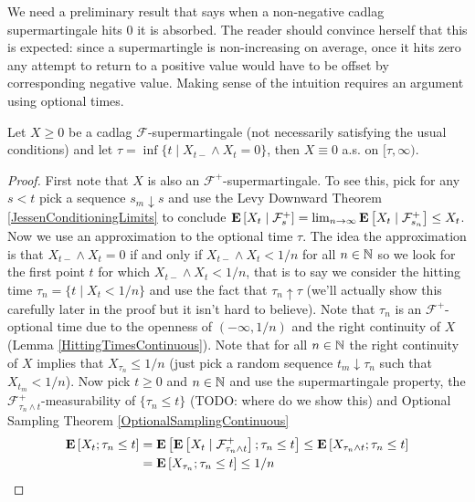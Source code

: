 We need a preliminary result that says when a non-negative cadlag supermartingale hits $0$ it is absorbed.  The reader should convince herself that this is expected: since a supermartingle is non-increasing on average, once it hits zero any attempt to return to a positive value would have to be offset by corresponding negative value.  Making sense of the intuition requires an argument using optional times.  
\begin{lem}\label{PositiveSupermartingaleAbsorption}Let $X \geq 0$ be a cadlag $\mathcal{F}$-supermartingale (not necessarily satisfying the usual conditions) and let $\tau = \inf \lbrace t \mid X_{t-} \wedge X_t =0 \rbrace$, then $X \equiv 0$ a.s. on $[\tau, \infty)$.
\end{lem}
\begin{proof}
First note that $X$ is also an $\mathcal{F}^+$-supermartingale.  To see this, pick for any $s < t$ pick a sequence $s_m \downarrow s$ and use the Levy Downward Theorem
\ref{JessenConditioningLimits}  to conclude $\cexpectationlong{\mathcal{F}_s^+}{X_t} = \lim_{n \to \infty} \cexpectationlong{\mathcal{F}_{s_n}^+}{X_t} \leq X_t$.  Now we use an approximation to the optional time $\tau$.  The idea the approximation is that $X_{t-} \wedge X_t=0$ if and only if $X_{t-} \wedge X_t < 1/n$ for all $n \in \naturals$ so we look for the first point $t$ for which $X_{t-} \wedge X_t < 1/n$, that is to say we consider the hitting time $\tau_n = \lbrace t \mid X_t < 1/n \rbrace$ and use the fact that $\tau_n \uparrow \tau$ (we'll actually show this carefully later in the proof but it isn't hard to believe).  Note that $\tau_n$ is an $\mathcal{F}^+$-optional time due to the openness of $(-\infty, 1/n)$ and the right continuity of $X$ (Lemma \ref{HittingTimesContinuous}).  Note that for all $n \in \naturals$ the right continuity of $X$ implies that $X_{\tau_n} \leq 1/n$ (just pick a random sequence $t_m \downarrow \tau_n$ such that $X_{t_m} < 1/n$).  Now pick $t \geq 0$ and $n \in \naturals$ and use the supermartingale property, the $\mathcal{F}^+_{\tau_n \wedge t}$-measurability of $\lbrace \tau_n \leq t \rbrace$ (TODO: where  do we show this) and Optional Sampling Theorem \ref{OptionalSamplingContinuous}
\begin{align*}
\expectation{ X_t ; \tau_n \leq t } &=\expectation{ \cexpectationlong{\mathcal{F}^+_{\tau_n \wedge t}}{X_t} ; \tau_n \leq t }  \leq \expectation{ X_{\tau_n \wedge t} ; \tau_n \leq t }  \\
&=\expectation{ X_{\tau_n} ; \tau_n \leq t } \leq 1/n
\end{align*}

\end{proof}
